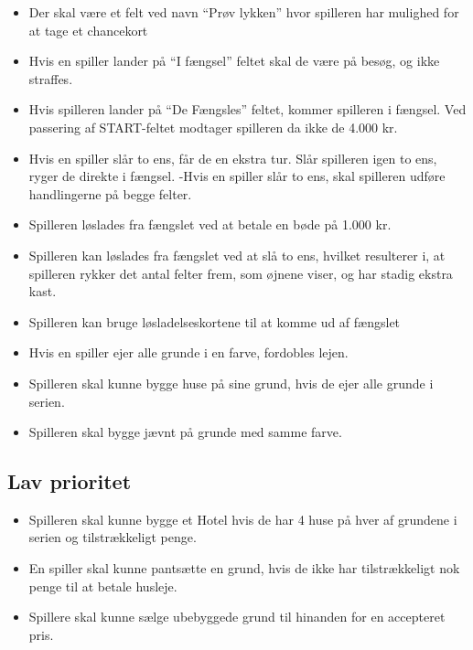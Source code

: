 \begin{itemize}
    \item Der skal være et felt ved navn “Prøv lykken” hvor spilleren har mulighed for at tage et chancekort
    \item Hvis en spiller lander på “I fængsel” feltet skal de være på besøg, og ikke straffes.
    \item Hvis spilleren lander på “De Fængsles” feltet, kommer spilleren i fængsel. Ved passering af START-feltet modtager spilleren da ikke de 4.000 kr.
    \item Hvis en spiller slår to ens, får de en ekstra tur. Slår spilleren igen to ens, ryger de direkte i fængsel.
       -Hvis en spiller slår to ens, skal spilleren udføre handlingerne på begge felter.
    \item Spilleren løslades fra fængslet ved at betale en bøde på 1.000 kr.
    \item Spilleren kan løslades fra fængslet ved at slå to ens, hvilket resulterer i, at spilleren rykker det antal felter frem, som øjnene viser, og har stadig ekstra kast.
    \item Spilleren kan bruge løsladelseskortene  til at komme ud af fængslet
    \item Hvis en spiller ejer alle grunde i en farve, fordobles lejen.
    \item Spilleren skal kunne bygge huse på sine grund, hvis de ejer alle grunde i serien.
    \item Spilleren skal bygge jævnt på grunde med samme farve.
\end{itemize}

\subsection{Lav prioritet}

\begin{itemize}
    \item Spilleren skal kunne bygge et Hotel hvis de har 4 huse på hver af grundene i serien og tilstrækkeligt penge.
    \item En spiller skal kunne pantsætte en grund, hvis de ikke har tilstrækkeligt nok penge til at betale husleje.
    \item Spillere skal kunne sælge ubebyggede grund til hinanden for en accepteret pris.
\end{itemize}
